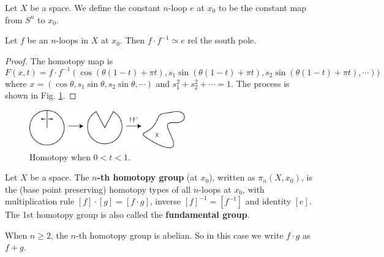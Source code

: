\documentclass[12pt]{book}
\begin{document}
\begin{definition}
	Let $X$ be a space. We define the constant $n$-loop $e$ at $x_0$ to be the constant map from $S^n$ to $x_0$.
\end{definition}

\begin{lemma}
	Let $f$ be an $n$-loops in $X$ at $x_0$. Then $f\cdot f^{-1}\simeq e$ rel the south pole.  
\end{lemma}
\begin{proof}
	The homotopy map is 
	\begin{equation}
		F(x,t)=f\cdot f^{-1}(\cos(\theta(1-t)+\pi t),s_1\sin(\theta(1-t)+\pi t),s_2\sin(\theta(1-t)+\pi t),\cdots))
	\end{equation}
	where $x=(\cos\theta,s_1\sin\theta,s_2\sin\theta,\cdots)$ and $s_1^2+s_2^2+\cdots=1$. The process is shown in Fig. \ref{fig:homotopy_inverse}.
\end{proof}

\begin{figure}[htb!]
	\centering  
	\includegraphics[width=0.6\textwidth ]{resources/chap_bas_cstr/invloop.pdf}  
	\caption{Homotopy when $0<t<1$.}
	\label{fig:homotopy_inverse}
\end{figure}

\begin{definition}
	Let $X$ be a space. The {\bf $n$-th homotopy group} (at $x_0$), written as $\pi_n(X,x_0)$, is the (base point preserving) homotopy types of all $n$-loops at $x_0$, with multiplication rule $[f]\cdot[g]=[f\cdot g]$, inverse $[f]^{-1}=[f^{-1}]$ and identity $[e]$. The 1st homotopy group is also called the {\bf fundamental group}.
\end{definition}

\begin{theorem}
	When $n\geq2$, the $n$-th homotopy group is abelian. So in this case we write $f\cdot g$ as $f+g$.
\end{theorem}
\end{document}

